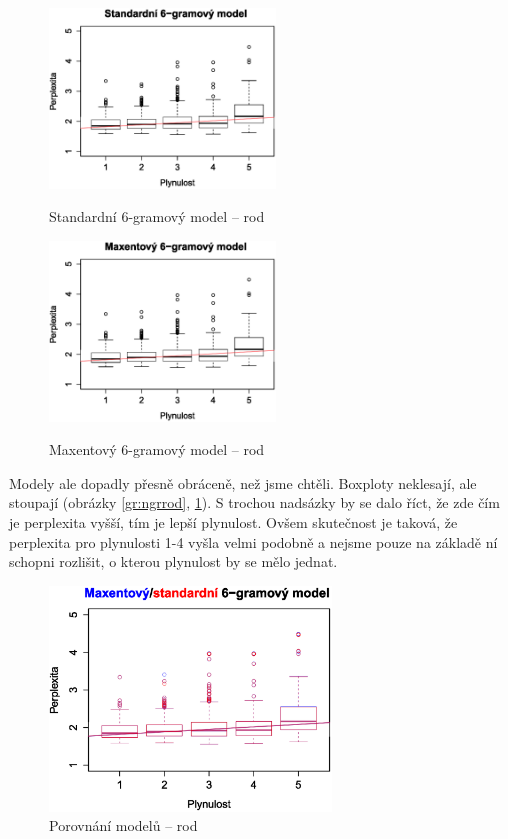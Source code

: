 \documentclass[12pt,a4paper]{report}
\begin{document}
\begin{figure}[!htb]
\begin{center}
  \centering\includegraphics[width=60mm]{./grafy/morf/ngram/rod.svg.eps}
  \caption{Standardní 6-gramový model -- rod}\label{gr:ngrrod}
\endminipage\quad
{}
  \centering\includegraphics[width=60mm]{./grafy/morf/maxent/rod.svg.eps}
  \caption{Maxentový 6-gramový model -- rod}\label{gr:maxrod}
\endminipage
\end{center}
\end{figure}

Modely ale dopadly přesně obráceně, než jsme chtěli. Box\-ploty neklesají, ale stoupají (obrázky \ref{gr:ngrrod}, \ref{gr:maxrod}). S trochou nadsázky by se dalo říct, že zde čím je perplexita vyšší, tím je lepší plynulost. Ovšem skutečnost je taková, že perplexita pro plynulosti 1-4 vyšla velmi podobně a nejsme pouze na základě ní schopni rozlišit, o kterou plynulost by se mělo jednat.





\begin{figure}[!htbp]
\begin{center}
	\centering
	\includegraphics[width=75mm]{./grafy/morf/porovnani/rod.svg.eps}	
	\caption{Porovnání modelů -- rod}\label{gr:porrod}
\endminipage
\end{center}
\end{figure}
\end{document}
